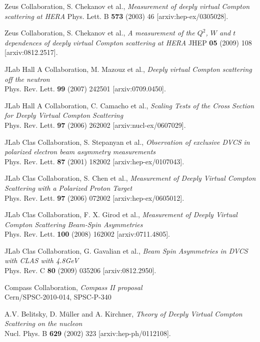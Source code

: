 \documentclass[11pt,a4paper]{article}
\begin{document}
\begin{thebibliography}{10}
Z{\sc eus} Collaboration, S. Chekanov et al., \emph{Measurement of deeply virtual Compton scattering at HERA}
Phys. Lett. B {\bf 573} (2003) 46 [arxiv:hep-ex/0305028].

Z{\sc eus} Collaboration, S. Chekanov et al., \emph{A measurement of the $Q^2$, $W$ and $t$ dependences of deeply virtual Compton scattering at HERA}
JHEP {\bf 05} (2009) 108 [arxiv:0812.2517].

JLab Hall A Collaboration, M. Mazouz et al., \emph{Deeply virtual Compton scattering off the neutron}
\\Phys. Rev. Lett. {\bf 99} (2007) 242501 [arxiv:0709.0450].

JLab Hall A Collaboration,  C. Camacho et al., \emph{Scaling Tests of the Cross Section for Deeply Virtual Compton Scattering}
\\Phys. Rev. Lett. \textbf{97} (2006) 262002 [arxiv:nucl-ex/0607029].

JLab C{\sc las} Collaboration, S. Stepanyan et al., \emph{Observation of exclusive DVCS in polarized electron beam asymmetry measurements}
\\Phys. Rev. Lett. {\bf 87} (2001) 182002 [arxiv:hep-ex/0107043].

JLab C{\sc las} Collaboration, S. Chen et al., \emph{Measurement of Deeply Virtual Compton Scattering with a Polarized Proton Target}
\\Phys. Rev. Lett. {\bf 97} (2006) 072002 [arxiv:hep-ex/0605012].

JLab C{\sc las} Collaboration, F. X. Girod et al., \emph{Measurement of Deeply Virtual Compton Scattering Beam-Spin Asymmetries}
\\Phys. Rev. Lett. \textbf{100} (2008) 162002 [arxiv:0711.4805].

JLab C{\sc las} Collaboration, G. Gavalian et al., \emph{Beam Spin Asymmetries in DVCS with CLAS with 4.8GeV}
\\Phys. Rev. C {\bf 80} (2009) 035206 [arxiv:0812.2950].

C{\sc ompass} Collaboration, \emph{Compass II proposal}
\\C{\sc ern}/SPSC-2010-014, SPSC-P-340

A.V. Belitsky, D. M\"uller and A. Kirchner, \emph{Theory of Deeply Virtual Compton Scattering on the nucleon}
\\Nucl. Phys. B \textbf{629} (2002) 323 [arxiv:hep-ph/0112108].


\end{thebibliography}
\end{document}
